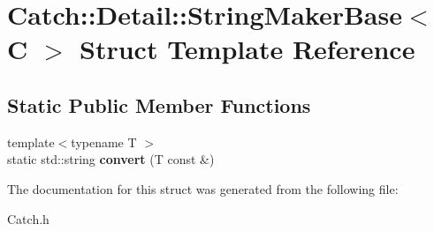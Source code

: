 \hypertarget{struct_catch_1_1_detail_1_1_string_maker_base}{\section{Catch\-:\-:Detail\-:\-:String\-Maker\-Base$<$ C $>$ Struct Template Reference}
\label{struct_catch_1_1_detail_1_1_string_maker_base}
}
\subsection*{Static Public Member Functions}
\begin{DoxyCompactItemize}
\item 
\hypertarget{struct_catch_1_1_detail_1_1_string_maker_base_a8eb9f635dc413a5758e22614bafaf1a3}{{\footnotesize template$<$typename T $>$ }\\static std\-::string {\bfseries convert} (T const \&)}\label{struct_catch_1_1_detail_1_1_string_maker_base_a8eb9f635dc413a5758e22614bafaf1a3}

\end{DoxyCompactItemize}


The documentation for this struct was generated from the following file\-:\begin{DoxyCompactItemize}
\item 
Catch.\-h\end{DoxyCompactItemize}
